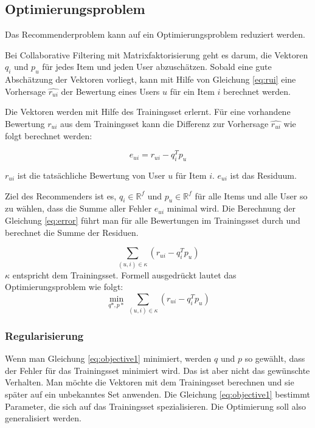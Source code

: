\documentclass[a4paper, 12pt]{article}
\begin{document}
\subsection{Optimierungsproblem}
\label{sec:optim}

Das Recommenderproblem kann auf ein Optimierungsproblem reduziert werden.

Bei Collaborative Filtering mit Matrixfaktorisierung geht es darum, die Vektoren $q_i$ und $p_u$ für jedes Item und jeden User abzuschätzen. Sobald eine gute Abschätzung der Vektoren vorliegt, kann mit Hilfe von Gleichung \ref{eq:rui} eine Vorhersage $ \hat{r_{ui}}$ der Bewertung eines Users $u$ für ein Item $i$ berechnet werden. 

Die Vektoren werden mit Hilfe des Trainingsset erlernt. 
Für eine vorhandene Bewertung $r_{ui}$ aus dem Trainingsset kann die Differenz zur Vorhersage $\hat{r_{ui}}$ wie folgt berechnet werden:

\begin{equation}
  \label{eq:error}
  e_{ui} = r_{ui} - q_i^T p_u
\end{equation}

$r_{ui}$ ist die tatsächliche Bewertung von User $u$ für Item $i$. 
$e_{ui}$ ist das Residuum.

Ziel des Recommenders ist es, $q_i \in \mathbb{R}^f$ und $p_u \in \mathbb{R}^f$ für alle Items und alle User so zu wählen, dass die Summe aller Fehler $e_{ui}$ minimal wird. Die Berechnung der Gleichung \ref{eq:error} führt man für alle Bewertungen im Trainingsset durch und berechnet die Summe der Residuen.

\begin{equation}
\label{eq:errorsum}
  \sum_{(u,i) \in \kappa} (r_{ui} - q_i^T p_u)
\end{equation}
$\kappa$ entspricht dem Trainingsset.
Formell ausgedrückt lautet das Optimierungsproblem wie folgt:
\begin{equation}
  \min_{q*,p*} \sum_{(u,i) \in \kappa} (r_{ui} - q_i^T p_u)
  \label{eq:objective1}
\end{equation}


\subsubsection{Regularisierung}
\label{sec:regularization}

Wenn man Gleichung \ref{eq:objective1} minimiert, werden $q$ und $p$ so gewählt, dass der Fehler für das Trainingsset minimiert wird. Das ist aber nicht das gewünschte Verhalten. Man möchte die Vektoren mit dem Trainingsset berechnen und sie später auf ein unbekanntes Set anwenden. Die Gleichung \ref{eq:objective1} bestimmt Parameter, die sich auf das Trainingsset spezialisieren. Die Optimierung soll also generalisiert werden.
\end{document}
